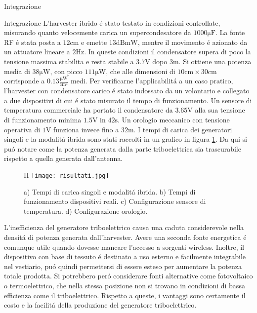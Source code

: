 \begin{section}{Integrazione}
    \begin{subsection}{Integrazione}
        L'harvester ibrido \'e stato testato in condizioni controllate, misurando quanto velocemente carica un supercondesatore da \(1000\mathrm{\mu F}\). La fonte RF \'e stata posta a \(12\mathrm{cm}\) e emette \(13\mathrm{dBmW}\), mentre il movimento \'e azionato da un attuatore lineare a \(2\mathrm{Hz}\). In queste condizioni il condensatore supera di poco la tensione massima stabilita e resta stabile a \(3.7\mathrm{V}\) dopo \(3\mathrm{m}\). Si ottiene una potenza media di \(38\mathrm{\mu W}\), con picco \(111\mathrm{\mu W}\), che alle dimensioni di \(10\mathrm{cm}\times30\mathrm{cm}\) corrisponde a \(0.13\mathrm{ \frac{\mu W}{cm^2}}\) medi. Per verificarne l'applicabilit\'a a un caso pratico, l'harvester con condensatore carico \'e stato indossato da un volontario e collegato a due dispositivi di cui \'e stato misurato il tempo di funzionamento. Un sensore di temperatura commerciale ha portato il condensatore da \(3.65\mathrm{V}\) alla sua tensione di funzionamento minima \(1.5\mathrm{V}\) in \(42\mathrm{s}\). Un orologio meccanico con tensione operativa di \(1\mathrm{V}\) funziona invece fino a \(32\mathrm{m}\).
        I tempi di carica dei generatori singoli e la modalit\'a ibrida sono stati raccolti in un grafico in figura \ref{fig:risultati}. Da qui si pu\'o notare come la potenza generata dalla parte triboelettrica sia trascurabile rispetto a quella generata dall'antenna.
        \begin{figure}{H}
            \texttt{[image: risultati.jpg]}
            \centering
            \caption{a) Tempi di carica singoli e modalit\'a ibrida. b) Tempi di funzionamento dispositivi reali. c) Configurazione sensore di temperatura. d) Configurazione orologio. \cite{kouWearableAllFabricHybrid2024}}
            \label{fig:risultati}
        \end{figure}
        L'inefficienza del generatore triboelettrico causa una caduta considerevole nella densit\'a di potenza generata dall'harvester. Avere una seconda fonte energetica \'e comunque utile quando dovesse mancare l'accesso a sorgenti wireless. Inoltre, il dispositivo con base di tessuto \'e destinato a uso esterno e facilmente integrabile nel vestiario, pu\'o quindi permettersi di essere esteso per aumentare la potenza totale prodotta. Si potrebbero per\'o considerare fonti alternative come fotovoltaico o termoelettrico, che nella stessa posizione non si trovano in condizioni di bassa efficienza come il triboelettrico. Rispetto a queste, i vantaggi sono certamente il costo e la facilit\'a della produzione del generatore triboelettrico.
    \end{subsection}



\end{section}